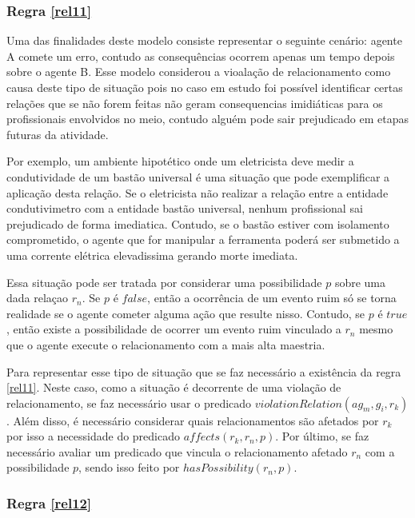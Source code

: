 \documentclass[12pt]{article}
\begin{document}
\subsubsection{Regra \ref{rel11}}


Uma das finalidades deste modelo consiste representar o seguinte cenário: agente A comete um erro, contudo as consequências ocorrem apenas um tempo depois sobre o agente B. Esse modelo considerou a vioalação de relacionamento como causa deste tipo de situação pois no caso em estudo foi possível identificar certas relações que se não forem feitas não geram consequencias imidiáticas para os profissionais envolvidos no meio, contudo alguém pode sair prejudicado em etapas futuras da atividade.

Por exemplo, um ambiente hipotético onde um eletricista deve medir a condutividade de um bastão universal é uma situação que pode exemplificar a aplicação desta relação. Se o eletricista não realizar a relação entre a entidade condutivimetro com a entidade bastão universal, nenhum profissional sai prejudicado de forma imediatica. Contudo, se o bastão estiver com isolamento comprometido, o agente que for manipular a ferramenta poderá ser submetido a uma corrente elétrica elevadissima gerando morte imediata.

Essa situação pode ser tratada por considerar uma possibilidade $p$ sobre uma dada relaçao $r_n$. Se $p$ é $false$, então a ocorrência de um evento ruim só se torna realidade se o agente cometer alguma ação que resulte nisso. Contudo, se $p$ é $true$, então existe a possibilidade de ocorrer um evento ruim vinculado a $r_n$ mesmo que o agente execute o relacionamento com a mais alta maestria.

Para representar esse tipo de situação que se faz necessário a existência da regra \ref{rel11}. Neste caso, como a situação é decorrente de uma violação de relacionamento, se faz necessário usar o predicado $violationRelation(ag_m,g_i,r_k)$. Além disso, é necessário considerar quais relacionamentos são afetados por $r_k$ por isso a necessidade do predicado $affects(r_k,r_n,p)$. Por último, se faz necessário avaliar um predicado que vincula o relacionamento afetado $r_n$ com a possibilidade $p$, sendo isso feito por $hasPossibility(r_n,p)$.


\subsubsection{Regra \ref{rel12}}
\end{document}
